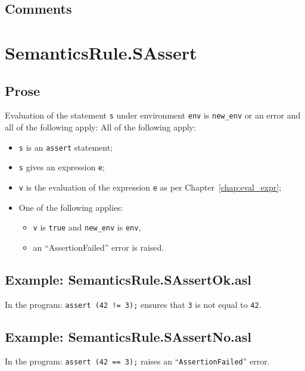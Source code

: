 \documentclass{book}
\begin{document}
    \subsection{Comments}

\section{SemanticsRule.SAssert \label{sec:SemanticsRule.SAssert}}

    \subsection{Prose}
  Evaluation of the statement \texttt{s} under environment \texttt{env} is
\texttt{new\_env} or an error and all of the following apply:
    All of the following apply:
    \begin{itemize}
    \item \texttt{s} is an \texttt{assert} statement;
    \item \texttt{s} gives an expression \texttt{e};
    \item \texttt{v} is the evaluation of the expression \texttt{e} as per Chapter~\ref{chap:eval_expr};
    \item One of the following applies:
          \begin{itemize}
          \item \texttt{v} is \texttt{true} and \texttt{new\_env} is \texttt{env},
          \item an ``AssertionFailed'' error is raised.
          \end{itemize}
    \end{itemize}

    \subsection{Example: SemanticsRule.SAssertOk.asl}
    In the program:
    \texttt{assert (42 != 3);} ensures that \texttt{3} is not equal to \texttt{42}.

    \subsection{Example: SemanticsRule.SAssertNo.asl}
    In the program:
    \texttt{assert (42 == 3);} raises an ``\texttt{AssertionFailed}'' error.
\end{document}
